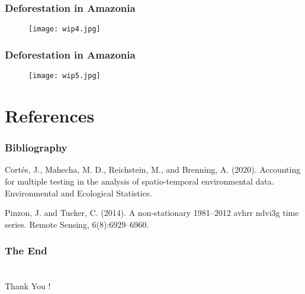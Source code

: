 \documentclass[11pt]{beamer}
\begin{document}
\begin{frame}[fragile]
  \frametitle{\normalsize{\textbf{
    Deforestation in Amazonia
  }}} 

  \scriptsize{  

    \begin{figure}[h!]
      \centering
      \texttt{[image: wip4.jpg]}
    \end{figure}

  }
\end{frame}

\begin{frame}[fragile]
  \frametitle{\normalsize{\textbf{
    Deforestation in Amazonia
  }}} 

  \scriptsize{  

    \begin{figure}[h!]
      \centering
      \texttt{[image: wip5.jpg]}
    \end{figure}

  }
\end{frame}

\section{References}

\begin{thebibliography}{99}
  
  \begin{frame}
    \frametitle{\normalsize{\textbf{
          Bibliography 
    }}}

    \scriptsize{
      
    \bibitem{}
      Cortés, J., Mahecha, M. D., Reichstein, M., and Brenning, A. (2020). 
      Accounting for multiple testing in the analysis of spatio-temporal 
      environmental data. Environmental and Ecological Statistics.

    \bibitem{}
      Pinzon, J. and Tucker, C. (2014). A non-stationary 1981–2012 avhrr ndvi3g
      time series. Remote Sensing, 6(8):6929–6960. 

    } 

  \end{frame}
\end{thebibliography}

\begin{frame}
  \frametitle{\normalsize{\textbf{The End}}}

  \section{}
  \begin{center}
    \huge{Thank You !}
  \end{center}

\end{frame}

\end{document}
